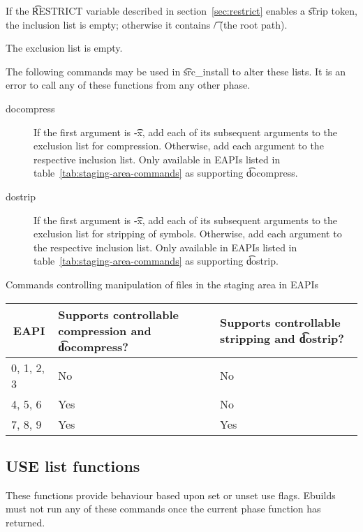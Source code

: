 \begin{compactitem}
\item If the \t{RESTRICT} variable described in section~\ref{sec:restrict} enables a \t{strip}
    token, the inclusion list is empty; otherwise it contains \t{/} (the root path).
\item The exclusion list is empty.
\end{compactitem}

The following commands may be used in \t{src_install} to alter these lists. It is an error to call
any of these functions from any other phase.

\begin{description}
\item[docompress] If the first argument is \t{-x}, add each of its subsequent arguments to the
    exclusion list for compression. Otherwise, add each argument to the respective inclusion list.
    Only available in EAPIs listed in table~\ref{tab:staging-area-commands} as supporting
    \t{docompress}.

\item[dostrip] If the first argument is \t{-x}, add each of its subsequent arguments to the
    exclusion list for stripping of symbols. Otherwise, add each argument to the respective
    inclusion list. Only available in EAPIs listed in table~\ref{tab:staging-area-commands} as
    supporting \t{dostrip}.
\end{description}

\begin{centertable}{Commands controlling manipulation of files in the staging area in EAPIs}
    \label{tab:staging-area-commands}
    \begin{tabular}{lll}
      \toprule
      \multicolumn{1}{c}{\textbf{EAPI}} &
      \multicolumn{1}{P{13.5em}}{\textbf{Supports controllable compression and \t{docompress}?}} &
      \multicolumn{1}{P{10.5em}}{\textbf{Supports controllable stripping and \t{dostrip}?}} \\
      \midrule
      0, 1, 2, 3        & No  & No  \\
      4, 5, 6           & Yes & No  \\
      7, 8, 9           & Yes & Yes \\
      \bottomrule
    \end{tabular}
\end{centertable}

\subsection{USE list functions}
These functions provide behaviour based upon set or unset use flags. Ebuilds must not run any of
these commands once the current phase function has returned.

